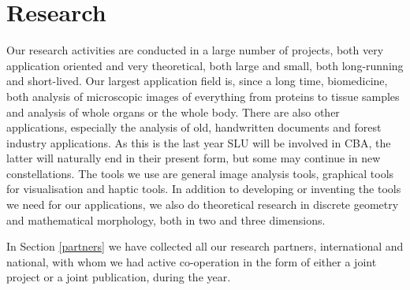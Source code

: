 \section{Research}\label{research}
\label{research_proj}
{\large
Our research activities are conducted in a large number of projects, both very application oriented and very theoretical, both large and small, both long-running and short-lived. Our largest application field is, since a long time, biomedicine, both analysis of microscopic images of everything from proteins to tissue samples and analysis of whole organs or the whole body. There are also other applications, especially the analysis of old, handwritten documents and forest industry applications. As this is the last year SLU will be involved in CBA, the latter will naturally end in their present form, but some may continue in new constellations. The tools we use are general image analysis tools, graphical tools for visualisation and haptic tools. In addition to developing or inventing the tools we need for our applications, we also do theoretical research in discrete geometry and mathematical morphology, both in two and three dimensions. 

In Section \ref{partners} we have collected all our research partners, international and national, with whom we had active co-operation in the form of either a joint project or a joint publication, during the year. 


}
